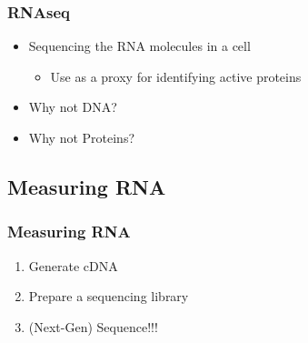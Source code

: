 \documentclass[14pt]{beamer}
\begin{document}
\begin{frame}
\frametitle{RNAseq}
	\begin{itemize}
		\item<+-> Sequencing the RNA molecules in a cell
		\begin{itemize}
			\item<+-> Use as a proxy for identifying active proteins
		\end{itemize}
		\item<+-> Why not DNA?
		\item<+-> Why not Proteins?
	\end{itemize}
\end{frame}

\subsection{Measuring RNA}

\begin{frame}
\frametitle{Measuring RNA}
	\begin{enumerate}
		\item<+-> Generate cDNA
		\item<+-> Prepare a sequencing library
		\item<+-> (Next-Gen) Sequence!!!
	\end{enumerate}
\end{frame}
\end{document}
